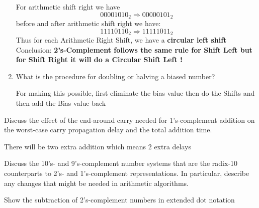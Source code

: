 \documentclass[16pt,answers]{exam}
\begin{document}
\begin{questions}
\begin{enumerate}
\begin{solution}
		For arithmetic shift right we have \[
			 0000 1010_{2} \Rightarrow0000 0101_{2}
		\]
		before and after arithmetic shift right we have:
		\[
			1111 0110_{2} \Rightarrow 1111 1011_{2}
		\]
		Thus for each Arithmetic Right Shift, we have a \textbf{circular left shift}\\
		Conclusion: \textbf{2's-Complement follows the same rule for  Shift Left  but for  Shift Right it will do a Circular Shift Left ! }
	\end{solution}
	
	\item What is the procedure for doubling or halving a biased number?
	\begin{solution}
		For making this possible, first eliminate the bias value then do the Shifts and then add the Bias value back
	\end{solution}
\end{enumerate}
	\question Discuss the effect of the end-around carry needed for 1’s-complement addition on
	the worst-case carry propagation delay and the total addition time.
	\begin{solution}
		There will be two extra addition which means 2 extra delays
	\end{solution}
	
	\question Discuss the 10’s- and 9’s-complement number systems that are the radix-10 counterparts to 2’s- and 1’s-complement representations. In particular, describe any
	changes that might be needed in arithmetic algorithms.
	
	\question
	Show the subtraction of 2’s-complement numbers in extended dot notation

\end{questions}
\end{document}
